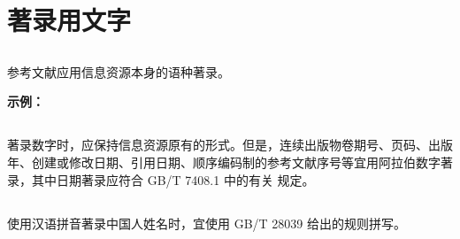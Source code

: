 \documentclass[twoside]{article}%
\begin{document}
\section{著录用文字}

{
\renewcommand\addcontentsline[3]{}
\subsection{} \label{sec:lan:infosrc} 参考文献应用信息资源本身的语种著录。


\textbf{示例：}%

\begin{refsection}
\nocite{gbt7714.5.1:1}
\nocite{japaneserefc}
\nocite{gbt7714.5.1:3}
\nocite{russianrefc}

{\printbibliography[env=indentegenv,heading=none]}
\end{refsection}

%
%
%
%


\subsection{} 著录数字时，应保持信息资源原有的形式。但是，连续出版物卷期号、页码、出版年、创建或修改日期、引用日期、顺序编码制的参考文献序号等宜用阿拉伯数字著录，其中日期著录应符合 GB/T 7408.1 中的有关
规定。

\subsection{} \label{sec:chn:names}  使用汉语拼音著录中国人姓名时，宜使用 GB/T 28039 给出的规则拼写。

}
\end{document}
